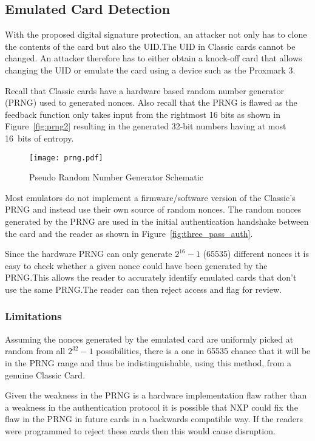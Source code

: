 \documentclass[dissertation.tex]{subfiles}
\begin{document}
  \subsection{Emulated Card Detection}
  With the proposed digital signature protection, an attacker not only has to clone the contents of the card but also the UID.\@ The UID in \mifare{} Classic cards cannot be changed. An attacker therefore has to either obtain a knock-off card that allows changing the UID or emulate the card using a device such as the Proxmark 3.

  Recall that \mifare{} Classic cards have a hardware based random number generator (PRNG) used to generated nonces. Also recall that the PRNG is flawed as the feedback function only takes input from the rightmost 16 bits as shown in Figure~\vref{fig:prng2} resulting in the generated 32-bit numbers having at most \SI{16}{bits} of entropy.

  \begin{figure}[h]
    \centering
    \texttt{[image: prng.pdf]}
    \caption{Pseudo Random Number Generator Schematic}\label{fig:prng2}
  \end{figure}

  Most emulators do not implement a firmware/software version of the \mifare{} Classic's PRNG and instead use their own source of random nonces. The random nonces generated by the PRNG are used in the initial authentication handshake between the card and the reader as shown in Figure~\vref{fig:three_pass_auth}.

  Since the hardware PRNG can only generate $2^{16}-1$ (\SI{65535}{}) different nonces it is easy to check whether a given nonce could have been generated by the PRNG.\@ This allows the reader to accurately identify emulated cards that don't use the same PRNG.\@ The reader can then reject access and flag for review.

  \subsubsection{Limitations}

  Assuming the nonces generated by the emulated card are uniformly picked at random from all $2^{32}-1$ possibilities, there is a one in \SI{65535}{} chance that it will be in the PRNG range and thus be indistinguishable, using this method, from a genuine \mifare{} Classic Card.

  Given the weakness in the PRNG is a hardware implementation flaw rather than a weakness in the authentication protocol it is possible that NXP could fix the flaw in the PRNG in future cards in a backwards compatible way. If the readers were programmed to reject these cards then this would cause disruption.
\end{document}
